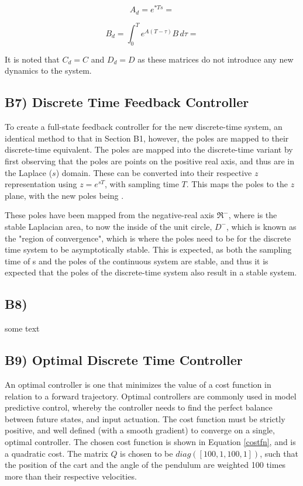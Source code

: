 \documentclass{article}
\begin{document}
\begin{equation}\label{ad}
    A_d=e^{*Ts}=
\end{equation}


\begin{equation}\label{Bd}
    B_d=\int_{0}^{T} e^{A(T - \tau)} B \, d\tau=
\end{equation}

It is noted that $C_d=C$ and $D_d=D$ as these matrices do not introduce any new dynamics to the system.



\subsection*{B7) Discrete Time Feedback Controller}
To create a full-state feedback controller for the new discrete-time system, an identical method to that in Section B1, however, the poles are mapped to their discrete-time equivalent. The poles are mapped into the discrete-time variant by first observing that the poles are points on the positive real axis, and thus are in the Laplace ($s$) domain. These can be converted into their respective $z$ representation using $z=e^{sT}$, with sampling time $T$. This maps the poles to the $z$ plane, with the new poles being . 
\newline

These poles have been mapped from the negative-real axis $\Re^-$, where is the stable Laplacian area, to now the inside of the unit circle, $D^-$, which is known as the "region of convergence", which is where the poles need to be for the discrete time system to be asymptotically stable. This is expected, as both the sampling time of s and 
the poles of the continuous system are stable, and thus it is expected that the poles of the discrete-time system also result in a stable system. 




\subsection*{B8) }
some text


\subsection*{B9) Optimal Discrete Time Controller}
An optimal controller is one that minimizes the value of a cost function in relation to a forward trajectory. Optimal controllers are commonly used in model predictive control, whereby the controller needs to find the perfect balance between future states, and input actuation. The cost function must be strictly positive, and well defined (with a smooth gradient) to converge on a single, optimal controller. The chosen cost function is shown in Equation \ref{costfn}, and is a quadratic cost. The matrix $Q$ is chosen to be $diag([100, 1, 100, 1])$, such that the position of the cart and the angle of the pendulum are weighted 100 times more than their respective velocities.
\end{document}
